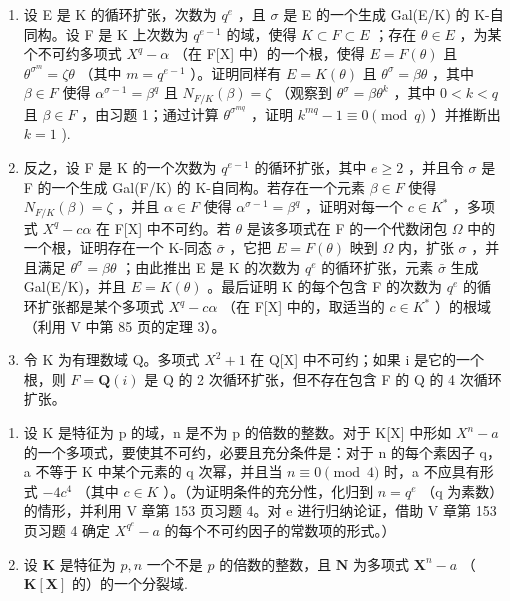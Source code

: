 \begin{enumerate}
\def\labelenumi{\alph{enumi})}
\item
  设 E 是 K 的循环扩张，次数为 \(q^e\) ，且 \(\sigma\) 是 E 的一个生成 Gal(E/K) 的 K-自同构。设 F 是 K 上次数为 \(q^{e-1}\) 的域，使得 \(K \subset F \subset E\) ；存在 \(\theta \in E\) ，为某个不可约多项式 \(X^q - \alpha\) （在 F{[}X{]} 中）的一个根，使得 \(E = F(\theta)\) 且 \(\theta^{\sigma^m} = \zeta\theta\) （其中 \(m = q^{e-1}\) ）。证明同样有 \(E = K(\theta)\) 且 \(\theta^\sigma = \beta\theta\) ，其中 \(\beta \in F\) 使得 \(\alpha^{\sigma-1} = \beta^q\) 且 \(N_{F/K}(\beta) = \zeta\) （观察到 \(\theta^\sigma = \beta\theta^k\) ，其中 \(0 < k < q\) 且 \(\beta \in F\) ，由习题 1；通过计算 \(\theta^{\sigma^{mq}}\) ，证明 \(k^{mq} - 1 \equiv 0 \pmod{q}\) ）并推断出 \(k = 1\) ).
\item
  反之，设 F 是 K 的一个次数为 \(q^{e-1}\) 的循环扩张，其中 \(e \geqslant 2\) ，并且令 \(\sigma\) 是 F 的一个生成 Gal(F/K) 的 K-自同构。若存在一个元素 \(\beta \in F\) 使得 \(N_{F/K}(\beta) = \zeta\) ，并且 \(\alpha \in F\) 使得 \(\alpha^{\sigma-1} = \beta^q\) ，证明对每一个 \(c \in K^*\) ，多项式 \(X^q - c\alpha\) 在 F{[}X{]} 中不可约。若 \(\theta\) 是该多项式在 F 的一个代数闭包 \(\Omega\) 中的一个根，证明存在一个 K-同态 \(\bar{\sigma}\) ，它把 \(E = F(\theta)\) 映到 \(\Omega\) 内，扩张 \(\sigma\) ，并且满足 \(\theta^{\sigma} = \beta\theta\) ；由此推出 E 是 K 的次数为 \(q^e\) 的循环扩张，元素 \(\bar{\sigma}\) 生成 Gal(E/K)，并且 \(E = K(\theta)\) 。最后证明 K 的每个包含 F 的次数为 \(q^e\) 的循环扩张都是某个多项式 \(X^q - c\alpha\) （在 F{[}X{]} 中的，取适当的 \(c \in K^*\) ）的根域（利用 V 中第 85 页的定理 3）。
\item
  令 K 为有理数域 Q。多项式 \(X^{2} + 1\) 在 Q{[}X{]} 中不可约；如果 i 是它的一个根，则 \(F = \mathbf{Q}(i)\) 是 Q 的 2 次循环扩张，但不存在包含 F 的 Q 的 4 次循环扩张。
\end{enumerate}

\begin{enumerate}
\def\labelenumi{\arabic{enumi})}
\setcounter{enumi}{4}
\item
  设 K 是特征为 p 的域，n 是不为 p 的倍数的整数。对于 K{[}X{]} 中形如 \(X^{n} - a\) 的一个多项式，要使其不可约，必要且充分条件是：对于 n 的每个素因子 q，a 不等于 K 中某个元素的 q 次幂，并且当 \(n \equiv 0 \pmod{4}\) 时，a 不应具有形式 \(-4c^{4}\) （其中 \(c \in K\) ）。（为证明条件的充分性，化归到 \(n = q^{e}\) （q 为素数）的情形，并利用 V 章第 153 页习题 4。对 e 进行归纳论证，借助 V 章第 153 页习题 4 确定 \(X^{q^{e}} - a\) 的每个不可约因子的常数项的形式。）
\item
  设 \(\mathbf{K}\) 是特征为 \(p, n\) 一个不是 \(p\) 的倍数的整数，且 \(\mathbf{N}\) 为多项式 \(\mathbf{X}^n - a\) （ \(\mathbf{K}[\mathbf{X}]\) 的）的一个分裂域.
\end{enumerate}

